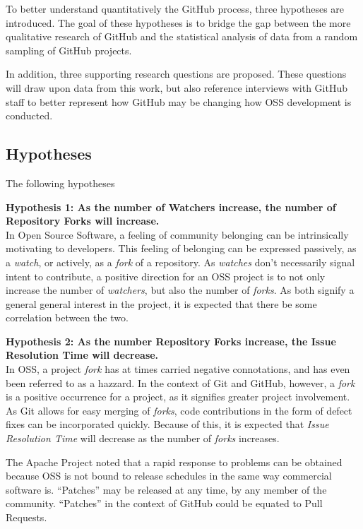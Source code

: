 \documentclass{proc}
\begin{document}
To better understand quantitatively the GitHub process, three hypotheses are introduced. The goal of these hypotheses is to bridge the gap between the more qualitative research of GitHub\cite{dabbish2012social,begel2013social} and the statistical analysis of data from a random sampling of GitHub projects.

In addition, three supporting research questions are proposed. These questions will draw upon data from this work, but also reference interviews with GitHub staff to better represent how GitHub may be changing how OSS development is conducted.

\subsection{Hypotheses}
The following hypotheses

\noindent \textbf{Hypothesis 1: As the number of Watchers increase, the number of Repository Forks will increase.}\\
In Open Source Software, a feeling of community belonging can be intrinsically motivating to developers\cite{lakhani2003hackers}. This feeling of belonging can be expressed passively, as a \emph{watch}, or actively, as a \emph{fork} of a repository. As \emph{watches} don't necessarily signal intent to contribute, a positive direction for an OSS project is to not only increase the number of \emph{watchers}, but also the number of \emph{forks}. As both signify a general general interest in the project, it is expected that there be some correlation between the two.

\noindent \textbf{Hypothesis 2: As the number Repository Forks increase, the Issue Resolution Time will decrease.}\\
In OSS, a project \emph{fork} has at times carried negative connotations, and has even been referred to as a hazzard\cite{kogut2001open}. In the context of Git and GitHub, however, a \emph{fork} is a positive occurrence for a project, as it signifies greater project involvement. As Git allows for easy merging of \emph{forks}, code contributions in the form of defect fixes can be incorporated quickly. Because of this, it is expected that \emph{Issue Resolution Time} will decrease as the number of \emph{forks} increases.

The Apache Project noted that a rapid response to problems can be obtained because OSS is not bound to release schedules in the same way commercial software is. ``Patches'' may be released at any time, by any member of the community\cite{mockus2000case}. ``Patches'' in the context of GitHub could be equated to Pull Requests.
\end{document}
